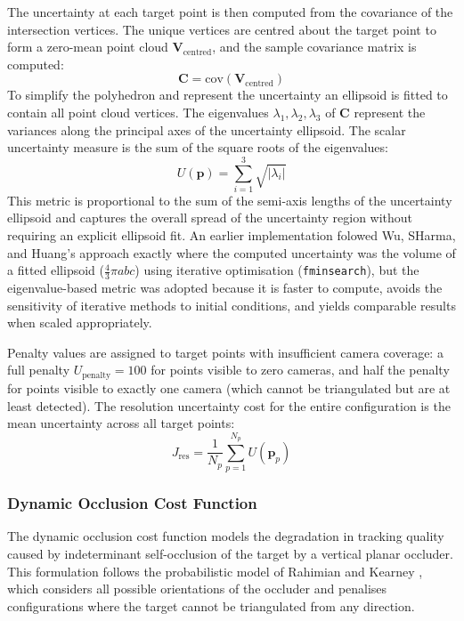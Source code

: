 The uncertainty at each target point is then computed from the covariance of the intersection vertices. The unique vertices are centred about the target point to form a zero-mean point cloud $\mathbf{V}_{\text{centred}}$, and the sample covariance matrix is computed:
%
\begin{equation}
\label{eq:covariance}
\mathbf{C} = \text{cov}(\mathbf{V}_{\text{centred}})
\end{equation}
%
To simplify the polyhedron and represent the uncertainty an ellipsoid is fitted to contain all point cloud vertices. The eigenvalues $\lambda_1, \lambda_2, \lambda_3$ of $\mathbf{C}$ represent the variances along the principal axes of the uncertainty ellipsoid. The scalar uncertainty measure is the sum of the square roots of the eigenvalues:
%
\begin{equation}
\label{eq:uncertainty-metric}
U(\mathbf{p}) = \sum_{i=1}^{3} \sqrt{|\lambda_i|}
\end{equation}
%
This metric is proportional to the sum of the semi-axis lengths of the uncertainty ellipsoid and captures the overall spread of the uncertainty region without requiring an explicit ellipsoid fit. An earlier implementation folowed Wu, SHarma, and Huang's approach exactly where the computed uncertainty was the volume of a fitted ellipsoid ($\frac{4}{3}\pi a b c$) using iterative optimisation (\texttt{fminsearch}), but the eigenvalue-based metric was adopted because it is faster to compute, avoids the sensitivity of iterative methods to initial conditions, and yields comparable results when scaled appropriately.

Penalty values are assigned to target points with insufficient camera coverage: a full penalty $U_{\text{penalty}} = 100$ for points visible to zero cameras, and half the penalty for points visible to exactly one camera (which cannot be triangulated but are at least detected). The resolution uncertainty cost for the entire configuration is the mean uncertainty across all target points:
%
\begin{equation}
\label{eq:res-uncertainty-cost}
J_{\text{res}} = \frac{1}{N_p} \sum_{p=1}^{N_p} U(\mathbf{p}_p)
\end{equation}

\subsubsection{Dynamic Occlusion Cost Function}
\label{sec:dynamic-occlusion}

The dynamic occlusion cost function models the degradation in tracking quality caused by indeterminant self-occlusion of the target by a vertical planar occluder. This formulation follows the probabilistic model of Rahimian and Kearney \parencite{rahimianOptimalCameraPlacement2017}, which considers all possible orientations of the occluder and penalises configurations where the target cannot be triangulated from any direction.

